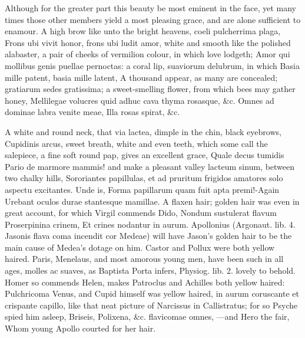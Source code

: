 {Although for the greater part this beauty be most eminent in the face,
yet many times those other members yield a most pleasing grace, and are
alone sufficient to enamour. A high brow like unto the bright heavens,
coeli pulcherrima plaga, Frons ubi vivit honor, frons ubi ludit amor,
white and smooth like the polished alabaster, a pair of cheeks of
vermilion colour, in which love lodgeth; Amor qui mollibus genis
puellae pernoctas: a coral lip, suaviorum delubrum, in which Basia
mille patent, basia mille latent, A thousand appear, as many are
concealed; gratiarum sedes gratissima; a sweet-smelling flower, from
which bees may gather honey, Mellilegae volucres quid adhuc cava
thyma rosasque, \&c.
Omnes ad dominae labra venite meae,
Illa rosas spirat, \&c.

A white and round neck, that via lactea, dimple in the chin, black
eyebrows, Cupidinis arcus, sweet breath, white and even teeth, which
some call the salepiece, a fine soft round pap, gives an excellent
grace, Quale decus tumidis Pario de marmore mammis! and
make a pleasant valley lacteum sinum, between two chalky hills,
Sororiantes papillulas, et ad pruritum frigidos amatores solo aspectu
excitantes. Unde is, Forma papillarum quam fuit apta premi!-Again
Urebant oculos durae stantesque mamillae. A flaxen hair; golden hair
was even in great account, for which Virgil commends Dido, Nondum
sustulerat flavum Proserpinina crinem, Et crines nodantur in aurum.
Apollonius (Argonaut. lib. 4. Jasonis flava coma incendit cor Medeae)
will have Jason's golden hair to be the main cause of Medea's dotage on
him. Castor and Pollux were both yellow haired. Paris, Menelaus, and
most amorous young men, have been such in all ages, molles ac suaves,
as Baptista Porta infers,  Physiog. lib. 2. lovely to behold.
Homer so commends Helen, makes Patroclus and Achilles both yellow
haired: Pulchricoma Venus, and Cupid himself was yellow haired, in
aurum coruscante et crispante capillo, like that neat picture of
Narcissus in Callistratus; for so Psyche spied him asleep,
Briseis, Polixena, \&c. flavicomae omnes,
---and Hero the fair,
Whom young Apollo courted for her hair.

}
